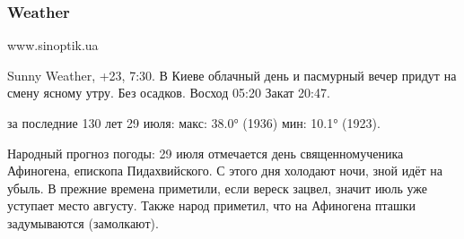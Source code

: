  

\subsubsection{Weather}
\label{sec:29_07_2020.weather}


www.sinoptik.ua

Sunny Weather, +23, 7:30. В Киеве облачный день и пасмурный вечер придут на
смену ясному утру. Без осадков. Восход 05:20 Закат 20:47.

за последние 130 лет 29 июля: макс: 38.0° (1936) мин: 10.1° (1923).

Народный прогноз погоды: 29 июля отмечается день священномученика Афиногена,
епископа Пидахвийского. С этого дня холодают ночи, зной идёт на убыль. В
прежние времена приметили, если вереск зацвел, значит июль уже уступает место
августу. Также народ приметил, что на Афиногена пташки задумываются
(замолкают).

 
